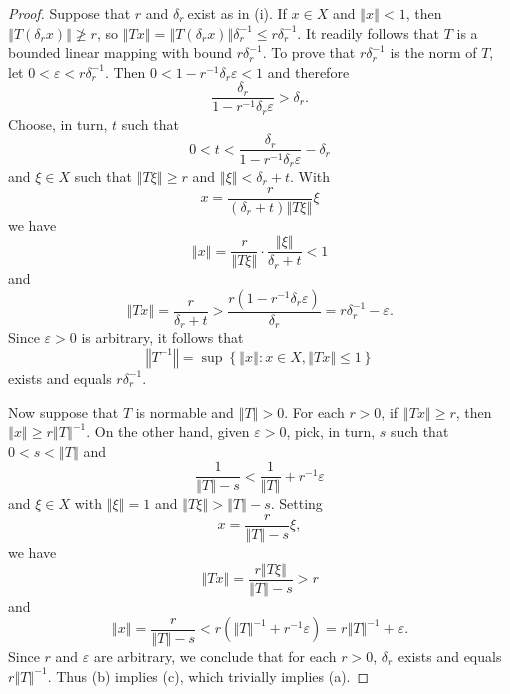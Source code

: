 \documentclass[10pt,a4paper]{amsart}
\begin{document}
\begin{proof}
Suppose that $r$ and $\delta_{r}\ $exist as in (i). If $x\in X$ and
$\left\Vert x\right\Vert <1$, then $\left\Vert T(\delta_{r}x)\right\Vert
\not \geq r$, so $\left\Vert Tx\right\Vert =\left\Vert T(\delta_{r}%
x)\right\Vert \delta_{r}^{-1}\leq r\delta_{r}^{-1}$. It readily follows that
$T$ is a bounded linear mapping with bound $r\delta_{r}^{-1}$. To prove that
$r\delta_{r}^{-1}$ is the norm of $T$, let $0<\varepsilon<r\delta_{r}^{-1}$.
Then $0<1-r^{-1}\delta_{r}\varepsilon<1$ and therefore%
\[
\frac{\delta_{r}}{1-r^{-1}\delta_{r}\varepsilon}>\delta_{r}.
\]
Choose, in turn, $t$ such that%
\[
0<t<\frac{\delta_{r}}{1-r^{-1}\delta_{r}\varepsilon}-\delta_{r}%
\]
and $\xi\in X$ such that $\left\Vert T\xi\right\Vert \geq r$ and $\left\Vert
\xi\right\Vert <\delta_{r}+t$. With%
\[
x=\frac{r}{\left(  \delta_{r}+t\right)  \left\Vert T\xi\right\Vert }\xi
\]
we have%
\[
\left\Vert x\right\Vert =\frac{r}{\left\Vert T\xi\right\Vert }\cdot
\frac{\left\Vert \xi\right\Vert }{\delta_{r}+t}<1
\]
and%
\[
\left\Vert Tx\right\Vert =\frac{r}{\delta_{r}+t}>\frac{r(1-r^{-1}\delta
_{r}\varepsilon)}{\delta_{r}}=r\delta_{r}^{-1}-\varepsilon.
\]
Since $\varepsilon>0$ is arbitrary, it follows that%
\[
\left\Vert T^{-1}\right\Vert =\sup\left\{  \left\Vert x\right\Vert :x\in
X,\left\Vert Tx\right\Vert \leq1\right\}
\]
exists and equals $r\delta_{r}^{-1}$.

Now suppose that $T$ is normable and $\left\Vert T\right\Vert >0$. For each
$r>0$, if $\left\Vert Tx\right\Vert \geq r$, then $\left\Vert x\right\Vert
\geq r\left\Vert T\right\Vert ^{-1}$. On the other hand, given $\varepsilon
>0$, pick, in turn, $s$ such that $0<s<\left\Vert T\right\Vert $ and%
\[
\frac{1}{\left\Vert T\right\Vert -s}<\frac{1}{\left\Vert T\right\Vert }%
+r^{-1}\varepsilon
\]
and $\xi\in X$ with $\left\Vert \xi\right\Vert =1$ and $\left\Vert
T\xi\right\Vert >\left\Vert T\right\Vert -s$. Setting%
\[
x=\frac{r}{\left\Vert T\right\Vert -s}\xi,
\]
we have%
\[
\left\Vert Tx\right\Vert =\frac{r\left\Vert T\xi\right\Vert }{\left\Vert
T\right\Vert -s}>r
\]
and%
\[
\left\Vert x\right\Vert =\frac{r}{\left\Vert T\right\Vert -s}<r\left(
\left\Vert T\right\Vert ^{-1}+r^{-1}\varepsilon\right)  =r\left\Vert
T\right\Vert ^{-1}+\varepsilon\text{.}%
\]
Since $r$ and $\varepsilon$ are arbitrary, we conclude that for each $r>0$,
$\delta_{r}$ exists and equals $r\left\Vert T\right\Vert ^{-1}$. Thus (b)
implies (c), which trivially implies (a).
\end{proof}
\end{document}

